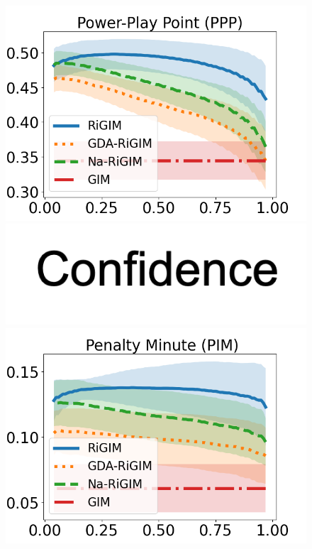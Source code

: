 \documentclass{article}
\begin{document}
\begin{figure}[htbp]
\begin{minipage}{0.16\textwidth}
    \includegraphics[scale=0.17]{figures/risk_curve_PPP_shadow.png}\par
    \vspace{-0.05in}
    \includegraphics[scale=0.15]{figures/confidence_x_label.png}
    \end{minipage}
    \begin{minipage}{0.16\textwidth}
    \centering
    \includegraphics[scale=0.17]{figures/risk_curve_PIM_shadow.png}\par

\end{minipage}
\end{figure}
\end{document}
